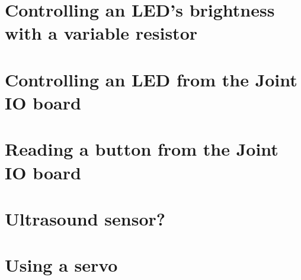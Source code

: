 \documentclass{article}
\begin{document}
\section{Controlling an LED's brightness with a variable resistor}

\section{Controlling an LED from the Joint IO board}

\section{Reading a button from the Joint IO board}

\section{Ultrasound sensor?}

\section{Using a servo}
\end{document}

